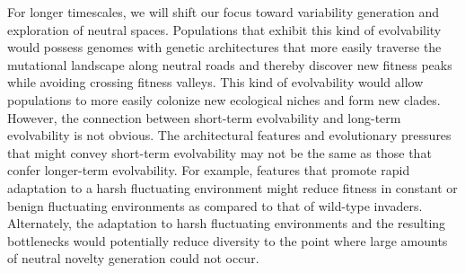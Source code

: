 \documentclass[10pt,letterpaper]{article}
\begin{document}
For longer timescales, we will shift our focus toward variability generation and exploration of neutral spaces. Populations that exhibit this kind of evolvability would possess genomes with genetic architectures that more easily traverse the mutational landscape along neutral roads and thereby discover new fitness peaks while avoiding crossing fitness valleys. This kind of evolvability would allow populations to more easily colonize new ecological niches and form new clades\cite{kirschner_evolvability_1998,brookfield_evolution:_2001}. However, the connection between short-term evolvability and long-term evolvability is not obvious. The architectural features and evolutionary pressures that might convey short-term evolvability may not be the same as those that confer longer-term evolvability\cite{pigliucci_is_2008}. For example, features that promote rapid adaptation to a harsh fluctuating environment might reduce fitness in constant or benign fluctuating environments as compared to that of wild-type invaders. Alternately, the adaptation to harsh fluctuating environments and the resulting bottlenecks would potentially reduce diversity to the point where large amounts of neutral novelty generation could not occur.
\end{document}
